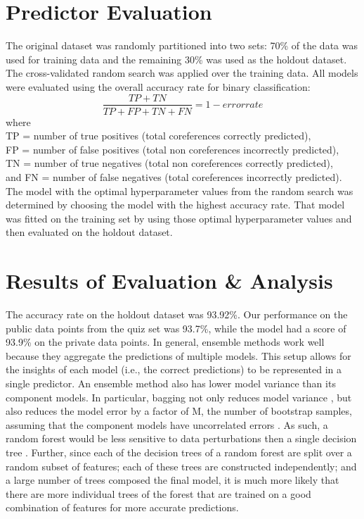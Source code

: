 \documentclass[twoside,11pt]{article}
\begin{document}
\section{Predictor Evaluation}
The original dataset was randomly partitioned into two sets: 70\% of the data was used for training data and the remaining 30\% was used as the holdout dataset. The cross-validated random search was applied over the training data. 
All models were evaluated using the overall accuracy rate for binary classification: \[\frac{TP + TN}{TP+FP+TN+FN} = 1 - error rate\]
where\\ 
TP = number of true positives (total coreferences correctly predicted), \\
FP = number of false positives (total non coreferences incorrectly predicted), \\
TN = number of true negatives (total non coreferences correctly predicted), \\
 and FN = number of false negatives (total coreferences incorrectly predicted).\\
 
The model with the optimal hyperparameter values from the random search was determined by choosing the model with the highest accuracy rate.  That model was fitted on the training set by using those optimal hyperparameter values and then evaluated on the holdout dataset.

\section{Results of Evaluation \& Analysis}
The accuracy rate on the holdout dataset was  93.92\%. Our performance on the public data points from the quiz set was 93.7\%, while the model had a score of 93.9\% on the private data points. In general, ensemble methods work well because they aggregate the predictions of multiple models. This setup allows for the insights of each model (i.e., the correct predictions) to be represented in a single predictor. An ensemble method also has lower model variance than its component models. In particular, bagging not only reduces model variance \citep[chap.~11]{hal06}, but also reduces the model error by a factor of M, the number of bootstrap samples, assuming that the component models have uncorrelated errors \citep[chap.~14]{chris06}. As such, a random forest would be less sensitive to data perturbations then a single decision tree \citep[chap.~11]{hal06}. Further, since each of the decision trees of a random forest are split over a random subset of features; each of these trees are constructed independently; and a large number of trees composed the final model, it is much more likely that there are more individual trees of the forest that are trained on a good combination of features for more accurate predictions.
\end{document}
